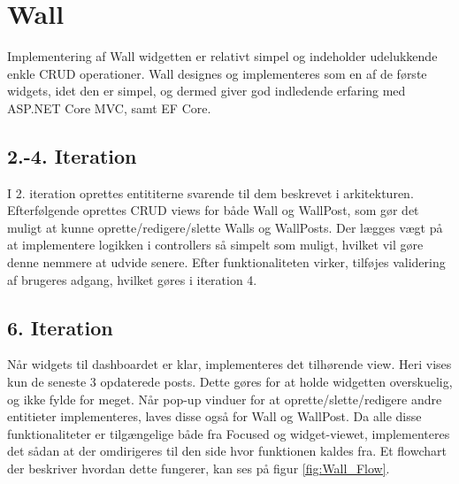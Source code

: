 \section{Wall}
Implementering af Wall widgetten er relativt simpel og indeholder udelukkende enkle CRUD operationer. Wall designes og implementeres som en af de første widgets, idet den er simpel, og dermed giver god indledende erfaring med ASP.NET Core MVC, samt EF Core.

\subsection{2.-4. Iteration}
I 2. iteration oprettes entititerne svarende til dem beskrevet i arkitekturen. Efterfølgende oprettes CRUD views for både Wall og WallPost, som gør det muligt at kunne oprette/redigere/slette Walls og WallPosts. Der lægges vægt på at implementere logikken i controllers så simpelt som muligt, hvilket vil gøre denne nemmere at udvide senere. Efter funktionaliteten virker, tilføjes validering af brugeres adgang, hvilket gøres i iteration 4.

\subsection{6. Iteration}
Når widgets til dashboardet er klar, implementeres det tilhørende view. Heri vises kun de seneste 3 opdaterede posts. Dette gøres for at holde widgetten overskuelig, og ikke fylde for meget. Når pop-up vinduer for at oprette/slette/redigere andre entitieter implementeres, laves disse også for Wall og WallPost. Da alle disse funktionaliteter er tilgængelige både fra Focused og widget-viewet, implementeres det sådan at der omdirigeres til den side hvor funktionen kaldes fra. Et flowchart der beskriver hvordan dette fungerer, kan ses på figur \ref{fig:Wall_Flow}.   

